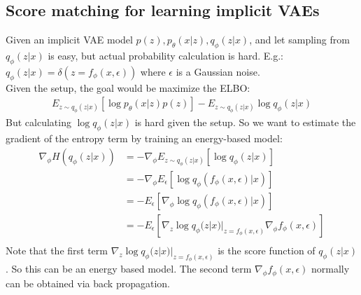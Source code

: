 \subsection{Score matching for learning implicit VAEs} 
Given an implicit VAE model $p(z), p_\theta(x|z), q_\phi(z|x)$, and let sampling from $q_\phi(z|x)$ is easy, but actual probability calculation is hard. E.g.: $q_\phi(z|x) = \delta(z = f_\phi(x, \epsilon))$ where $\epsilon$ is a Gaussian noise. \\
Given the setup, the goal would be maximize the ELBO: 
    \begin{align*}
        E_{z\sim q_\phi(z|x)}[\log p_\theta(x|z) p(z)] - E_{z\sim q_\phi(z|x)}\log q_\phi(z|x)
    \end{align*}
But calculating $\log q_\phi(z|x)$ is hard given the setup. So we want to estimate the gradient of the entropy term by training an energy-based model: 
    \begin{align*}
        \nabla_\phi H(q_\phi(z|x)) 
        & = -\nabla_\phi E_{z\sim q_\phi(z|x)}[\log q_\phi(z|x)]\\
        & = -\nabla_\phi E_\epsilon[\log q_\phi(f_\phi(x,\epsilon)|x)]\\
        & = - E_\epsilon[\nabla_\phi\log q_\phi(f_\phi(x,\epsilon)|x)]\\
        & = - E_\epsilon[\nabla_z \log q_\phi(z|x)|_{z=f_\phi(x,\epsilon)} \nabla_\phi f_\phi(x,\epsilon)]\\
    \end{align*}
Note that the first term $\nabla_z \log q_\phi(z|x)|_{z=f_\phi(x,\epsilon)}$ is the score function of $q_\phi(z|x)$. So this can be an energy based model.  The second term $\nabla_\phi f_\phi(x,\epsilon)$ normally can be obtained via back propagation. 


